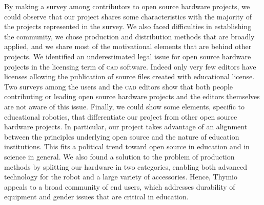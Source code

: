 \documentclass[letterpaper, 10 pt, conference]{ieeeconf}  %
\begin{document}
By making a survey among contributors to open source hardware projects, we could observe that our project shares some characteristics with the majority of the projects represented in the survey. 
We also faced difficulties in establishing the community, we chose production and distribution methods that are broadly applied, and we share most of the motivational elements that are behind other projects.
We identified an underestimated legal issue for open source hardware projects in the licensing term of \textsc{cad} software.
Indeed only very few editors have licenses allowing the publication of source files created with educational license.
Two surveys among the users and the \textsc{cad} editors show that both people contributing or leading open source hardware projects and the editors themselves are not aware of this issue.
Finally, we could show some elements, specific to educational robotics, that differentiate our project from other open source hardware projects.
In particular, our project takes advantage of an alignment between the principles underlying open source and the nature of education institutions. 
This fits a political trend toward open source in education and in science in general.
We also found a solution to the problem of production methods by splitting our hardware in two categories, enabling both advanced technology for the robot and a large variety of accessories.
Hence, Thymio appeals to a broad community of end users, which addresses durability of equipment and gender issues that are critical in education.











%
%
%



\end{document}
